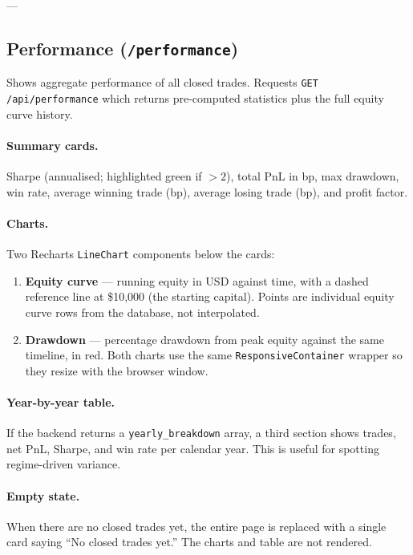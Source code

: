\documentclass[12pt, a4paper]{article}
\begin{document}
---

\subsection{Performance (\texttt{/performance})}

Shows aggregate performance of all closed trades. Requests
\texttt{GET /api/performance} which returns pre-computed statistics
plus the full equity curve history.

\paragraph{Summary cards.}
Sharpe (annualised; highlighted green if $> 2$), total PnL in bp, max drawdown,
win rate, average winning trade (bp), average losing trade (bp), and profit factor.

\paragraph{Charts.}
Two Recharts \texttt{LineChart} components below the cards:
\begin{enumerate}[noitemsep]
  \item \textbf{Equity curve} — running equity in USD against time, with a dashed
        reference line at \$10,000 (the starting capital). Points are individual
        equity curve rows from the database, not interpolated.
  \item \textbf{Drawdown} — percentage drawdown from peak equity against the same
        timeline, in red. Both charts use the same \texttt{ResponsiveContainer}
        wrapper so they resize with the browser window.
\end{enumerate}

\paragraph{Year-by-year table.}
If the backend returns a \texttt{yearly\_breakdown} array, a third section
shows trades, net PnL, Sharpe, and win rate per calendar year. This is
useful for spotting regime-driven variance.

\paragraph{Empty state.}
When there are no closed trades yet, the entire page is replaced with a
single card saying ``No closed trades yet.'' The charts and table are not
rendered.
\end{document}
